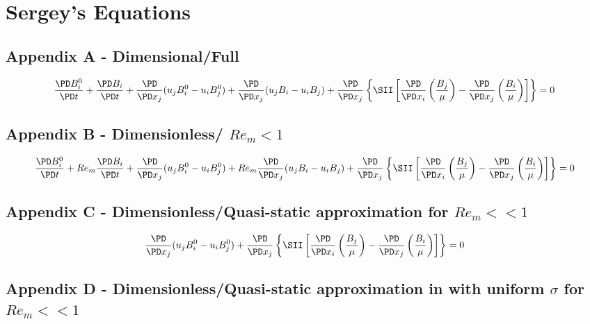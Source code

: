 \documentclass[11pt]{article}
\begin{document}
\section{Sergey's Equations}

\subsection{Appendix A - Dimensional/Full}

\begin{equation*}
	\frac{\PD B_i^0}{\PD t}
	+
	\frac{\PD B_i}{\PD t}
	+
	\frac{\PD}{\PD x_j} (u_j B_i^0 - u_i B_j^0)
	+
	\frac{\PD}{\PD x_j} (u_j B_i - u_i B_j)
	+
	\frac{\PD}{\PD x_j}
	\left\{ \SII
	\left[
	\frac{\PD}{\PD x_i}
	\left( \frac{B_j}{\mu} \right)
	-
	\frac{\PD}{\PD x_j}
	\left( \frac{B_i}{\mu} \right)
	\right]
	\right\}
	=
	0
\end{equation*}


\subsection{Appendix B - Dimensionless/ \texorpdfstring{$Re_m<1$}{LG}}

\begin{equation*}
	\frac{\PD B_i^0}{\PD t}
	+
 	Re_m
	\frac{\PD B_i}{\PD t}
	+
	\frac{\PD}{\PD x_j} (u_j B_i^0 - u_i B_j^0)
	+
 	Re_m
	\frac{\PD}{\PD x_j} (u_j B_i - u_i B_j)
	+
	\frac{\PD}{\PD x_j}
	\left\{ \SII
	\left[
	\frac{\PD}{\PD x_i}
	\left( \frac{B_j}{\mu} \right)
	-
	\frac{\PD}{\PD x_j}
	\left( \frac{B_i}{\mu} \right)
	\right]
	\right\}
	=
	0
\end{equation*}


\subsection{Appendix C - Dimensionless/Quasi-static approximation for \texorpdfstring{$Re_m<<1$}{LG}}

\begin{equation*}
	\frac{\PD}{\PD x_j} (u_j B_i^0 - u_i B_j^0)
	+
	\frac{\PD}{\PD x_j}
	\left\{ \SII
	\left[
	\frac{\PD}{\PD x_i}
	\left( \frac{B_j}{\mu} \right)
	-
	\frac{\PD}{\PD x_j}
	\left( \frac{B_i}{\mu} \right)
	\right]
	\right\}
	=
	0
\end{equation*}

\subsection{Appendix D - Dimensionless/Quasi-static approximation in with uniform \texorpdfstring{$\sigma$}{LG} for \texorpdfstring{$Re_m<<1$}{LG}}
\end{document}

